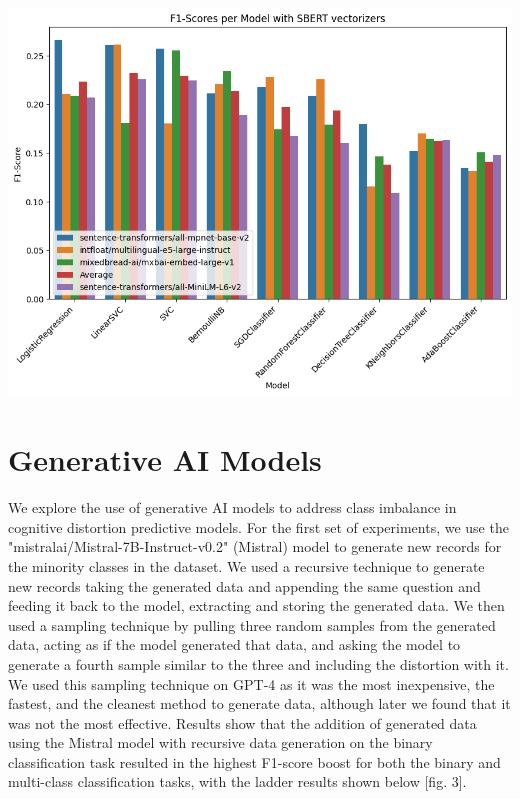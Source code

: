 \documentclass[a0,landscape]{a0poster}
\begin{document}
\begin{multicols}{4}
\begin{center}\vspace{1cm}
\includegraphics[width=0.81\linewidth]{figures/F1ScoresInitSBERT.png}
\end{center}

\color{Black}

\color{Teal}
\section*{Generative AI Models}
\color{Black}

We explore the use of generative AI models to address class imbalance in cognitive distortion predictive models. For the first set of experiments, we use the "mistralai/Mistral-7B-Instruct-v0.2" (Mistral) model to generate new records for the minority classes in the dataset. We used a recursive technique to generate new records taking the generated data and appending the same question and feeding it back to the model, extracting and storing the generated data. We then used a sampling technique by pulling three random samples from the generated data, acting as if the model generated that data, and asking the model to generate a fourth sample similar to the three and including the distortion with it. We used this sampling technique on GPT-4 as it was the most inexpensive, the fastest, and the cleanest method to generate data, although later we found that it was not the most effective. Results show that the addition of generated data using the Mistral model with recursive data generation on the binary classification task resulted in the highest F1-score boost for both the binary and multi-class classification tasks, with the ladder results shown below [fig. 3].


\end{multicols}
\end{document}
